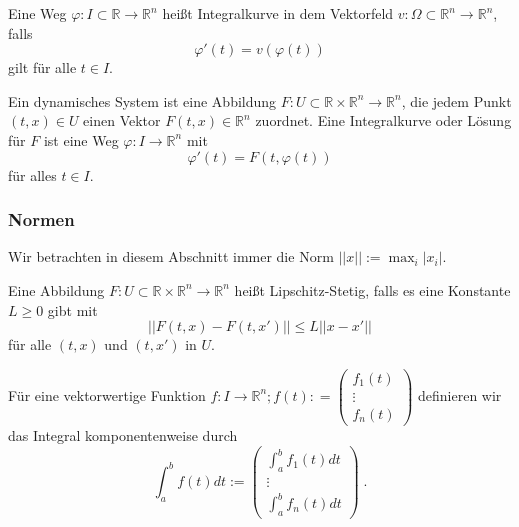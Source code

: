 \begin{Definition}
Eine Weg $\varphi : I \subset \mathbb{R} \to \mathbb{R}^n$ heißt Integralkurve in dem Vektorfeld $v : \Omega \subset \mathbb{R}^n \to \mathbb{R}^n$, falls 
$$\varphi' (t) = v(\varphi(t))$$ gilt für alle $t \in  I$.
\end{Definition}

\begin{Definition}
Ein dynamisches System ist eine  Abbildung $F : U \subset \mathbb{R} \times \mathbb{R}^n \to \mathbb{R}^n$, die jedem Punkt $(t,x)  \in U$ einen Vektor $F(t,x) \in \mathbb{R}^n$ zuordnet. Eine Integralkurve oder Lösung für $F$ ist eine Weg $\varphi : I \to \mathbb{R}^n$ mit 
$$\varphi'(t) = F(t, \varphi(t)) $$
für alles $t \in I$.
\end{Definition}


\begin{Satz}
\end{Satz}

\subsubsection*{Normen}
Wir betrachten in diesem Abschnitt immer die Norm $|| x || := \max_i | x_i |$. 

\begin{Definition}
Eine  Abbildung $F : U \subset \mathbb{R} \times \mathbb{R}^n \to \mathbb{R}^n$ heißt Lipschitz-Stetig,
falls es eine Konstante $L \geq 0$ gibt  mit
$$ || F(t,x) - F(t,x') ||  \leq L || x -x' ||  $$
für alle $(t,x)$ und $(t,x')$ in $U$.
\end{Definition}

\begin{Definition}
Für eine  vektorwertige Funktion  $f : I   \to \mathbb{R}^n; f(t) : = \begin{pmatrix} f_1(t)  \\ \vdots \\ f_n(t) \end{pmatrix}$ definieren wir das Integral komponentenweise durch
$$\int_{a}^{b}  f(t) dt := \begin{pmatrix} \int_{a}^{b}  f_1(t) dt  \\ \vdots \\ \int_{a}^{b}  f_n(t) dt \end{pmatrix} \; .$$
\end{Definition}


